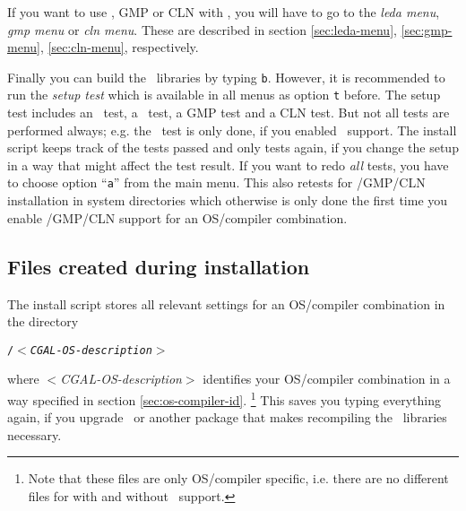 If you want to use \leda, GMP or CLN with \cgal, you will have to go
to the \textit{leda menu}, \textit{gmp menu} or \textit{cln menu}.
These are described in section \ref{sec:leda-menu},
\ref{sec:gmp-menu}, \ref{sec:cln-menu}, respectively.

Finally you can build the \cgal\ libraries by typing \texttt{b}.
However, it is recommended to run the \textit{setup test} which is
available in all menus as option \texttt{t} before. The setup test
includes an \stl\ test, a \leda\ test, a GMP test and a CLN test. But
not all tests are performed always; e.g. the \leda\ test is only done,
if you enabled \leda\ support. The install script keeps track of the
tests passed and only tests again, if you change the setup in a way
that might affect the test result. If you want to redo \textit{all}
tests, you have to choose option ``\texttt{a}'' from the main menu.
This also retests for \leda/GMP/CLN installation in system directories
which otherwise is only done the first time you enable \leda/GMP/CLN
support for an OS/compiler combination.

\subsection{Files created during installation}\label{sec:filescreated}

The install script stores all relevant settings for an OS/compiler
combination in the directory
\begin{center}
  \texttt{\cgalinstconfdir/$<$\textit{CGAL-OS-description}$>$}
\end{center}
where $<$\textit{CGAL-OS-description}$>$ identifies your OS/compiler
combination in a way specified in section \ref{sec:os-compiler-id}.
\footnote{Note that these files are only OS/compiler specific, i.e.
  there are no different files for with and without \leda\ support.}
This saves you typing everything again, if you upgrade
 \cgal\ or another
package that makes recompiling the \cgal\ libraries necessary.


